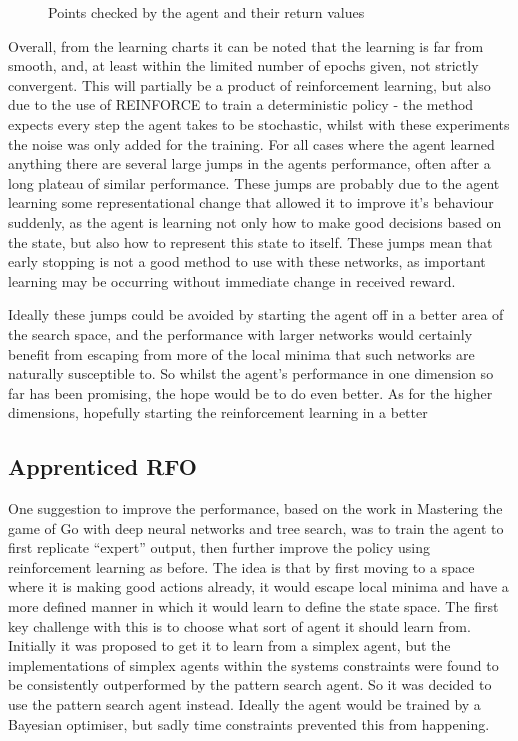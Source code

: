 \begin{figure}
\centering

\caption{Points checked by the agent and their return values}
\label{fig:locexp}
\end{figure}

Overall, from the learning charts it can be noted that the learning is far from smooth, and, at least within the limited number of epochs given, not strictly convergent.  %
This will partially be a product of reinforcement learning, but also due to the use of REINFORCE to train a deterministic policy - the method expects every step the agent takes to be stochastic, whilst with these experiments the noise was only added for the training. For all cases where the agent learned anything there are several large jumps in the agents performance, often after a long plateau of similar performance. These jumps are probably due to the agent learning some representational change that allowed it to improve it's behaviour suddenly, as the agent is learning not only how to make good decisions based on the state, but also how to represent this state to itself. These jumps mean that early stopping is not a good method to use with these networks, as important learning may be occurring without immediate change in received reward.

Ideally these jumps could be avoided by starting the agent off in a better area of the search space, and the performance with larger networks would certainly benefit from escaping from more of the local minima that such networks are naturally susceptible to. So whilst the agent's performance in one dimension so far has been promising, the hope would be to do even better. As for the higher dimensions, hopefully starting the reinforcement learning in a better 

\subsection{Apprenticed RFO}



One suggestion to improve the performance, based on the work in Mastering the game of Go with deep neural networks and tree search\cite{alphaGo}, was to train the agent to first replicate ``expert'' output, then further improve the policy using reinforcement learning as before. The idea is that by first moving to a space where it is making good actions already, it would escape local minima and have a more defined manner in which it would learn to define the state space. The first key challenge with this is to choose what sort of agent it should learn from. Initially it was proposed to get it to learn from a simplex agent, but the implementations of simplex agents within the systems constraints were found to be consistently outperformed by the pattern search agent. So it was decided to use the pattern search agent instead. Ideally the agent would be trained by a Bayesian optimiser, but sadly time constraints prevented this from happening.

